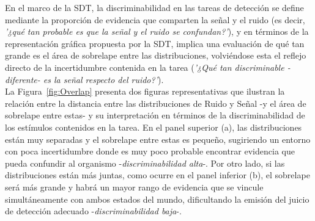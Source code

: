 En el marco de la SDT, la discriminabilidad en las tareas de detección se define mediante la proporción de evidencia que comparten la señal y el ruido (es decir, \textit{'¿qué tan probable es que la señal y el ruido se confundan?'}), y en términos de la representación gráfica propuesta por la SDT, implica una evaluación de qué tan grande es el área de sobrelape entre las distribuciones, volviéndose esta el reflejo directo de la incertidumbre contenida en la tarea (\textit{'¿Qué tan discriminable -diferente- es la señal respecto del ruido?'}).\\

La Figura~\ref{fig:Overlap} presenta dos figuras representativas que ilustran la relación entre la distancia entre las distribuciones de Ruido y Señal -y el área de sobrelape entre estas- y su interpretación en términos de la discriminabilidad de los estímulos contenidos en la tarea. En el panel superior (a), las distribuciones están muy separadas y el sobrelape entre estas es pequeño, sugiriendo un entorno con poca incertidumbre donde es muy poco probable encontrar evidencia que pueda confundir al organismo -\textit{discriminabilidad alta}-. Por otro lado, si las distribuciones están más juntas, como ocurre en el panel inferior (b), el sobrelape será más grande y habrá un mayor rango de evidencia que se vincule simultáneamente con ambos estados del mundo, dificultando la emisión del juicio de detección adecuado -\textit{discriminabilidad baja}-.\\

